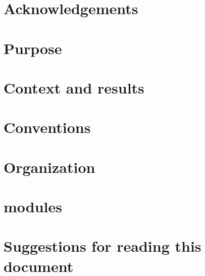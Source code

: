 \section*{Acknowledgements}                                                                            
\section*{Purpose}                                                                                     
\section*{Context and results}                                                                         
\section*{Conventions}                                \label{sec: introduction: conventions}           
\section*{Organization}                               \label{sec: introduction: organization}             
\section*{\specDeprecated{} modules}                  \label{sec: introduction: deprecated modules}    
\section*{Suggestions for reading this document}                                                       
